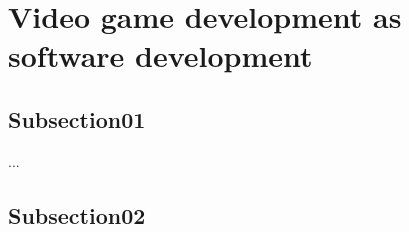 \section{Video game development as software development}
    \subsection{Subsection01}
    ...

    \subsection{Subsection02}
